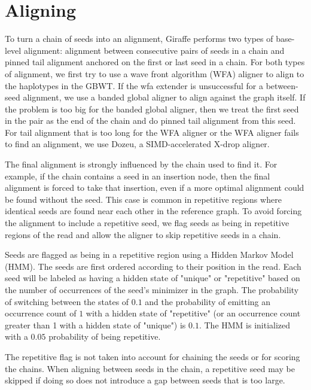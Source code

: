 \documentclass[11pt]{ucscthesis}
\begin{document}
\section{Aligning} 
\label{sec:sup-aligning}

To turn a chain of seeds into an alignment, Giraffe performs two types of base-level alignment: alignment between consecutive pairs of seeds in a chain and pinned tail alignment anchored on the first or last seed in a chain.
For both types of alignment, we first try to use a wave front algorithm (WFA) aligner \citep{marco-sola_fast_wfa_2021,marco-sola_wfa_2023} to align to the haplotypes in the GBWT.
If the wfa extender is unsuccessful for a between-seed alignment, we use a banded global aligner to align against the graph itself.
If the problem is too big for the banded global aligner, then we treat the first seed in the pair as the end of the chain and do pinned tail alignment from this seed.
For tail alignment that is too long for the WFA aligner or the WFA aligner fails to find an alignment, we use Dozeu, a SIMD-accelerated X-drop aligner.

The final alignment is strongly influenced by the chain used to find it.
For example, if the chain contains a seed in an insertion node, then the final alignment is forced to take that insertion, even if a more optimal alignment could be found without the seed.
This case is common in repetitive regions where identical seeds are found near each other in the reference graph.
To avoid forcing the alignment to include a repetitive seed, we flag seeds as being in repetitive regions of the read and allow the aligner to skip repetitive seeds in a chain.

Seeds are flagged as being in a repetitive region using a Hidden Markov Model (HMM).
The seeds are first ordered according to their position in the read. 
Each seed will be labeled as having a hidden state of "unique" or "repetitive" based on the number of occurrences of the seed's minimizer in the graph.
The probability of switching between the states of $0.1$ and the probability of emitting an occurrence count of $1$ with a hidden state of "repetitive" (or an occurrence count greater than 1 with a hidden state of "unique") is $0.1$.
The HMM is initialized with a $0.05$ probability of being repetitive.

The repetitive flag is not taken into account for chaining the seeds or for scoring the chains.
When aligning between seeds in the chain, a repetitive seed may be skipped if doing so does not introduce a gap between seeds that is too large.
\end{document}
